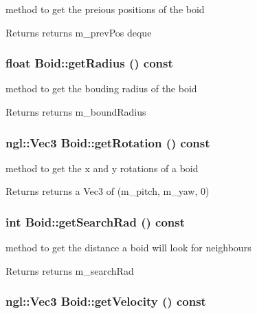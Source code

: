 method to get the preious positions of the boid \begin{DoxyReturn}{Returns}
returns m\_\-prevPos deque 
\end{DoxyReturn}
\hypertarget{classBoid_a5ff5c09aa0f501a097116a453013986f}{
\subsubsection[{getRadius}]{\setlength{\rightskip}{0pt plus 5cm}float Boid::getRadius () const}}
\label{classBoid_a5ff5c09aa0f501a097116a453013986f}


method to get the bouding radius of the boid \begin{DoxyReturn}{Returns}
returns m\_\-boundRadius 
\end{DoxyReturn}
\hypertarget{classBoid_aef5f32444ae2ae6fff812cb8272e437f}{
\subsubsection[{getRotation}]{\setlength{\rightskip}{0pt plus 5cm}ngl::Vec3 Boid::getRotation () const}}
\label{classBoid_aef5f32444ae2ae6fff812cb8272e437f}


method to get the x and y rotations of a boid \begin{DoxyReturn}{Returns}
returns a Vec3 of (m\_\-pitch, m\_\-yaw, 0) 
\end{DoxyReturn}
\hypertarget{classBoid_ab474ff0fa3273519a0284bda734d7119}{
\subsubsection[{getSearchRad}]{\setlength{\rightskip}{0pt plus 5cm}int Boid::getSearchRad () const}}
\label{classBoid_ab474ff0fa3273519a0284bda734d7119}


method to get the distance a boid will look for neighbours \begin{DoxyReturn}{Returns}
returns m\_\-searchRad 
\end{DoxyReturn}
\hypertarget{classBoid_a9b8109fd5bb93268c2591bf0b87a920d}{
\subsubsection[{getVelocity}]{\setlength{\rightskip}{0pt plus 5cm}ngl::Vec3 Boid::getVelocity () const}}
\label{classBoid_a9b8109fd5bb93268c2591bf0b87a920d}


